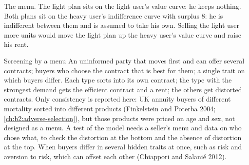 \begin{omfigure}

{\small The  menu. The light plan sits on the light user's value curve: he keeps nothing. Both plans sit on the
heavy user's indifference curve with surplus 8: he is indifferent between them and is assumed to take his own. Selling the
light user more units would move the light plan up the heavy user's value curve and raise his rent.}
\end{omfigure}

\begin{model}{Screening by a menu}
\assumes An uninformed party that moves first and can offer several contracts; buyers who choose the contract that is
best for them; a single trait on which buyers differ.
\predicts Each type sorts into its own contract; the type with the strongest demand gets the efficient contract and a rent;
the others get distorted contracts.
\tested Only consistency is reported here: UK annuity buyers of different mortality sorted into different products
(Finkelstein and Poterba 2004; \cref{ch:b2:adverse-selection}), but those products were priced on age and sex, not
designed as a menu. A test of the model needs a seller's menu and data on who chose what, to check the distortion at
the bottom and the absence of distortion at the top.
\breaks When buyers differ in several hidden traits at once, such as risk and aversion to risk, which can offset each other
(Chiappori and Salani\'e 2012).
\end{model}

